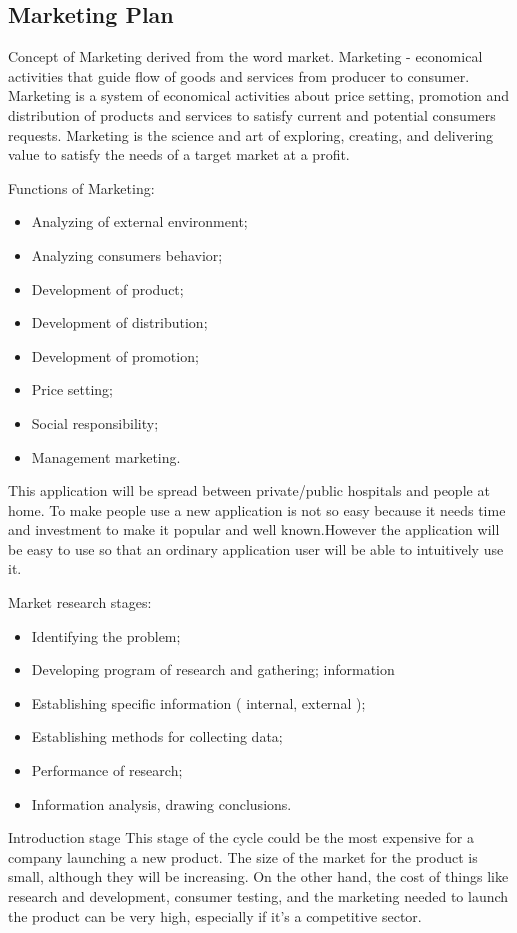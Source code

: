 \subsection{Marketing Plan}
Concept of Marketing derived from the word market. Marketing - economical activities that guide flow of goods and services from producer to consumer.  Marketing is a system of economical activities about price setting, promotion and distribution of products and services to satisfy current and potential consumers requests. Marketing is the science and art of exploring, creating, and delivering value to satisfy the needs of a target market at a profit.

 Functions of Marketing:
 \begin{itemize}
 \item Analyzing of external environment;
 \item Analyzing consumers behavior;
 \item Development of product;
 \item Development of distribution;
 \item Development of promotion;
 \item Price setting;
 \item Social responsibility;
 \item Management marketing.
\end{itemize}

This application will be spread between private/public hospitals and people at home. To make people use a new application is not so easy because it needs time and investment to make it popular and well known.However the application will be easy to use so that an ordinary application user will be able to intuitively use it.

Market research stages:
\begin{itemize}
 \item Identifying the problem;
 \item Developing program of research and gathering;
information
 \item Establishing specific information ( internal, external );
 \item Establishing methods for collecting data;
 \item Performance of research;
 \item Information analysis, drawing conclusions.
\end{itemize}

Introduction stage This stage of the cycle could be the most expensive for a company launching a new product. The size of the market for the product is small, although they will be increasing. On the other hand, the cost of things like research and development, consumer testing, and the marketing needed to launch the product can be very high, especially if it's a competitive sector.

